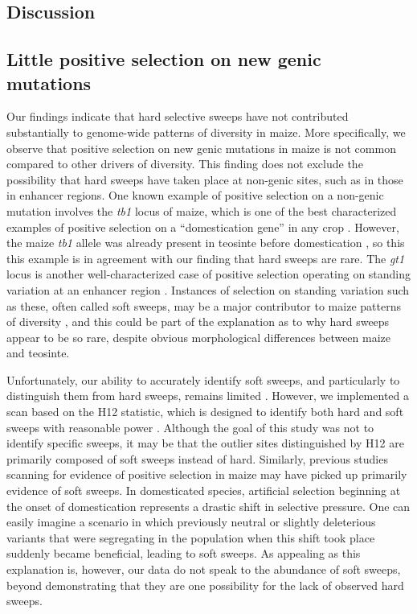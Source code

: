 \documentclass{pnastwo}
\begin{document}
\begin{article}
\section{Discussion}
\subsection{Little positive selection on new genic mutations}
Our findings indicate that hard selective sweeps have not contributed substantially to genome-wide patterns of diversity in maize. More specifically, we observe that positive selection on new genic mutations in maize is not common compared to other drivers of diversity. This finding does not exclude the possibility that hard sweeps have taken place at non-genic sites, such as in those in enhancer regions. One known example of positive selection on a non-genic mutation involves the \emph{tb1} locus of maize, which is one of the best characterized examples of positive selection on a ``domestication gene'' in any crop \cite{clark2006}. However, the maize \emph{tb1} allele was already present in teosinte before domestication \cite{studer2011}, so this this example is in agreement with our finding that hard sweeps are rare. The \emph{gt1} locus is another well-characterized case of positive selection operating on standing variation at an enhancer region \cite{wills2013}. Instances of selection on standing variation such as these, often called soft sweeps, may be a major contributor to maize patterns of diversity \cite{beissinger2014}, and this could be part of the explanation as to why hard sweeps appear to be so rare, despite obvious morphological differences between maize and teosinte.

Unfortunately, our ability to accurately identify soft sweeps, and particularly to distinguish them from hard sweeps, remains limited \cite{innan2004,messer2013}. However, we implemented a scan based on the H12 statistic, which is designed to identify both hard and soft sweeps with reasonable power \cite{garud2015}. Although the goal of this study was not to identify specific sweeps, it may be that the outlier sites distinguished by H12 are primarily composed of soft sweeps instead of hard. Similarly, previous studies scanning for evidence of positive selection in maize \cite{hufford2012} may have picked up primarily evidence of soft sweeps. In domesticated species, artificial selection beginning at the onset of domestication represents a drastic shift in selective pressure. One can easily imagine a scenario in which previously neutral or slightly deleterious variants that were segregating in the population when this shift took place suddenly became beneficial, leading to soft sweeps. As appealing as this explanation is, however, our data do not speak to the abundance of soft sweeps, beyond demonstrating that they are one possibility for the lack of observed hard sweeps.


\end{article}
\end{document}
